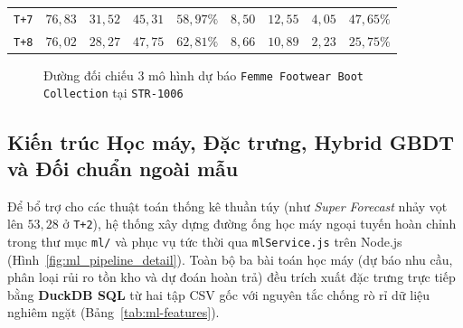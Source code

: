 \begin{table}[H]
\begin{tabular}{c | r r r r | r r r r}
		\texttt{T+7} & $76{,}83$                                                  & $31{,}52$                                                   & $45{,}31$         & $58{,}97\%$      & $8{,}50$        & $12{,}55$      & $4{,}05$          & $47{,}65\%$      \\
		\texttt{T+8} & $76{,}02$                                                  & $28{,}27$                                                   & $47{,}75$         & $62{,}81\%$      & $8{,}66$        & $10{,}89$      & $2{,}23$          & $25{,}75\%$      \\
		\bottomrule
	\end{tabular}
\end{table}

\begin{figure}[H]
	\centering
	\footnotesize
	\caption{Đường đối chiếu $3$ mô hình dự báo \texttt{Femme Footwear Boot Collection} tại \texttt{STR-1006}}
	\label{fig:forecast-empirical-chart}
\end{figure}

\subsection{Kiến trúc Học máy, Đặc trưng, Hybrid GBDT và Đối chuẩn ngoài mẫu}
\label{sec:ch4-ml-forecast}
Để bổ trợ cho các thuật toán thống kê thuần túy (như \textit{Super Forecast} nhảy vọt lên $53{,}28$ ở \texttt{T+2}), hệ thống xây dựng đường ống học máy ngoại tuyến hoàn chỉnh trong thư mục \texttt{ml/} và phục vụ tức thời qua \texttt{mlService.js} trên Node.js (Hình~\ref{fig:ml_pipeline_detail}). Toàn bộ ba bài toán học máy (dự báo nhu cầu, phân loại rủi ro tồn kho và dự đoán hoàn trả) đều trích xuất đặc trưng trực tiếp bằng \textbf{DuckDB SQL} từ hai tập CSV gốc với nguyên tắc chống rò rỉ dữ liệu nghiêm ngặt (Bảng~\ref{tab:ml-features}).

